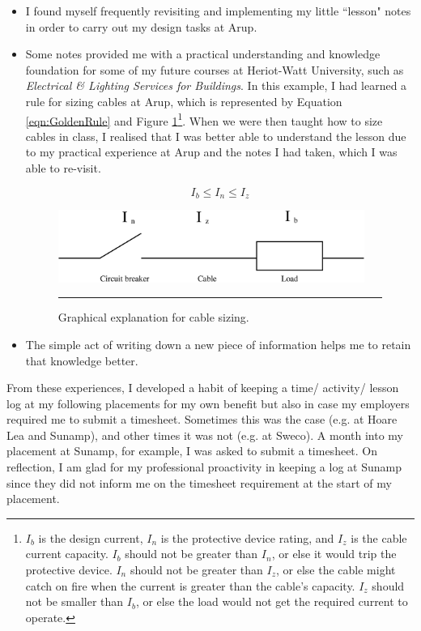 \begin{itemize}
	\item I found myself frequently revisiting and implementing my little ``lesson" notes in order to carry out my design tasks at Arup.
	\item Some notes provided me with a practical understanding and knowledge foundation for some of my future courses at Heriot-Watt University, such as \textit{Electrical \& Lighting Services for Buildings}.
	In this example, I had learned a rule for sizing cables at Arup, which is represented by Equation \ref{eqn:GoldenRule} and Figure \ref{fig:GoldenRule}\footnote{
		$I_b$ is the design current, $I_n$ is the protective device rating, and $I_z$ is the cable current capacity.
		$I_b$ should not be greater than $I_n$, or else it would trip the protective device.
		$I_n$ should not be greater than $I_z$, or else the cable might catch on fire when the current is greater than the cable's capacity.
		$I_z$ should not be smaller than $I_b$, or else the load would not get the required current to operate.
		}.
	When we were then taught how to size cables in class, I realised that I was better able to understand the lesson due to my practical experience at Arup and the notes I had taken, which I was able to re-visit.
	
	\begin{equation}
	I_b \leq I_n \leq I_z
	\label{eqn:GoldenRule}
	\end{equation}
	
	\begin{figure}[H]
		\centering
		\includegraphics[width=10cm]{figures/GoldenRule.eps}
		\rule{10cm}{0.5pt} %
		\caption{Graphical explanation for cable sizing.}
		\label{fig:GoldenRule}
	\end{figure}
	
	\item The simple act of writing down a new piece of information helps me to retain that knowledge better.
\end{itemize}

From these experiences, I developed a habit of keeping a time/ activity/ lesson log at my following placements for my own benefit but also in case my employers required me to submit a timesheet.
Sometimes this was the case (e.g. at Hoare Lea and Sunamp), and other times it was not (e.g. at Sweco).
A month into my placement at Sunamp, for example, I was asked to submit a timesheet.
On reflection, I am glad for my professional proactivity in keeping a log at Sunamp since they did not inform me on the timesheet requirement at the start of my placement.



